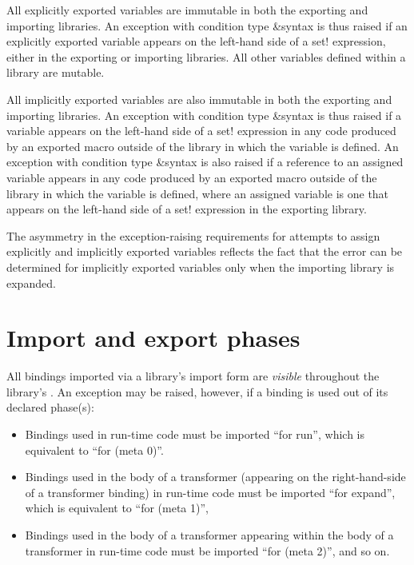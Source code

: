 \label{importsareimmutablesection} 
All explicitly exported variables are immutable in both the
exporting and importing libraries. 
An exception with condition type {\cf\&syntax} is thus raised if an
explicitly exported variable appears on the left-hand side of a {\cf set!}
expression, either in the exporting or importing libraries.
All other variables defined within a library are mutable.

All implicitly exported variables are also immutable in both the
exporting and importing libraries.
An exception with condition type {\cf\&syntax} is thus raised if a
variable appears on the left-hand side of a {\cf set!}
expression in any code produced by an exported macro outside of the
library in which the variable is defined.
An exception with condition type {\cf\&syntax} is also raised if a
reference to an assigned variable appears in any code produced by
an exported macro outside of the library in which the variable is defined,
where an assigned variable is one that appears on the left-hand
side of a {\cf set!} expression in the exporting library.

\begin{note}
The asymmetry in the exception-raising requirements for attempts to assign
explicitly and implicitly exported variables reflects the fact that the
error can be determined for implicitly exported variables only when the
importing library is expanded.
\end{note}

\section{Import and export phases}
\label{phasessection}

All bindings imported via a library's {\cf import} form are
\emph{visible} throughout the library's .
An exception may be raised, however, if a binding is used out of its declared
phase(s):

\begin{itemize}
\item Bindings used in run-time code must be imported ``for {\cf run}'',
which is equivalent to ``for {\cf (meta 0)}''.
\item Bindings used in the body of a transformer (appearing on the
right-hand-side of a transformer binding) in run-time code must be
imported ``for {\cf expand}'', which is equivalent to
``for {\cf (meta 1)}'',
\item Bindings used in the body of a transformer appearing within the body of a
transformer in run-time code must be imported ``for {\cf (meta 2)}'',
and so on.
\end{itemize}

